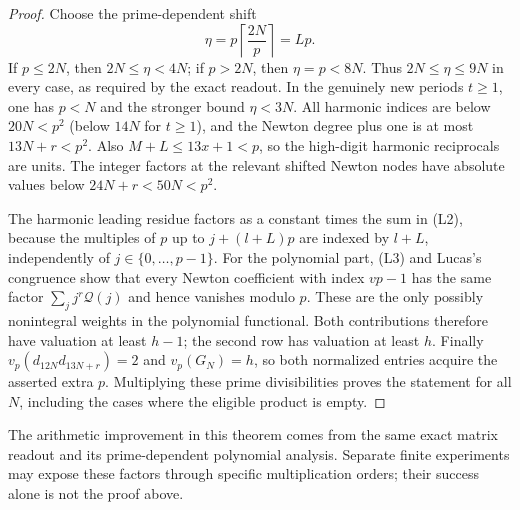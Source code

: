 \begin{proof}
Choose the prime-dependent shift
\[
 \eta=p\left\lceil\frac{2N}{p}\right\rceil=Lp.
\]
If $p\le2N$, then $2N\le\eta<4N$; if $p>2N$, then
$\eta=p<8N$. Thus $2N\le\eta\le9N$ in every case, as required by
the exact readout. In the genuinely new periods $t\ge1$, one has
$p<N$ and the stronger bound $\eta<3N$.
All harmonic indices are below $20N<p^2$ (below $14N$ for $t\ge1$),
and the Newton degree plus one is at most $13N+r<p^2$.
Also $M+L\le13x+1<p$, so the high-digit harmonic reciprocals are units.
The integer factors at the relevant shifted Newton nodes have
absolute values below $24N+r<50N<p^2$.

The harmonic leading residue factors as a constant times the sum in
(L2), because the multiples of $p$ up to $j+(l+L)p$ are indexed by
$l+L$, independently of $j\in\{0,\ldots,p-1\}$.
For the polynomial part, (L3) and Lucas's congruence show that every
Newton coefficient with index $vp-1$ has the same factor
$\sum_jj^r\mathcal Q(j)$ and hence vanishes modulo $p$.
These are the only possibly nonintegral weights in the polynomial
functional. Both contributions therefore have valuation at least
$h-1$; the second row has valuation at least $h$.
Finally $v_p(d_{12N}d_{13N+r})=2$ and $v_p(G_N)=h$, so both
normalized entries acquire the asserted extra $p$.
Multiplying these prime divisibilities proves the statement for all $N$,
including the cases where the eligible product is empty.
\end{proof}

The arithmetic improvement in this theorem comes from the same exact
matrix readout and its prime-dependent polynomial analysis. Separate
finite experiments may expose these factors through specific
multiplication orders; their success alone is not the proof above.

